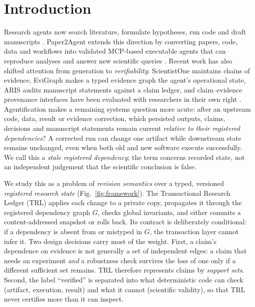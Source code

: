 \documentclass[cmc,article,submit,moreauthors,pdftex]{Definitions/tsp}
\begin{document}
\section{Introduction}
\label{sec:intro}
Research agents now search literature, formulate hypotheses, run code and draft manuscripts \cite{boiko2023coscientist,bran2024chemcrow,swanson2025virtuallab,schmidgall2025agentlab}. Paper2Agent extends this direction by converting papers, code, data and workflows into validated MCP-based executable agents that can reproduce analyses and answer new scientific queries \cite{miao2026paper2agent}. Recent work has also shifted attention from generation to \emph{verifiability}: ScientistOne maintains chains of evidence, EviGraph makes a typed evidence graph the agent's operational state, ARIS audits manuscript statements against a claim ledger, and claim--evidence provenance interfaces have been evaluated with researchers in their own right \cite{meng2026scientistone,ren2026evigraph,yang2026aris,martinboyle2026papertrail}. Agentification makes a remaining systems question more acute: after an upstream code, data, result or evidence correction, which persisted outputs, claims, decisions and manuscript statements remain current \emph{relative to their registered dependencies}? A corrected run can change one artifact while downstream state remains unchanged, even when both old and new software execute successfully. We call this a \emph{stale registered dependency}; the term concerns recorded state, not an independent judgement that the scientific conclusion is false.

We study this as a problem of \emph{revision semantics} over a typed, versioned \emph{registered research state} (Fig.~\ref{fig:framework}). The Transactional Research Ledger (TRL) applies each change to a private copy, propagates it through the registered dependency graph $G$, checks global invariants, and either commits a content-addressed snapshot or rolls back. Its contract is deliberately conditional: if a dependency is absent from or mistyped in $G$, the transaction layer cannot infer it. Two design decisions carry most of the weight. First, a claim's dependence on evidence is not generally a set of independent edges: a claim that needs an experiment \emph{and} a robustness check survives the loss of one only if a different sufficient set remains. TRL therefore represents claims by \emph{support sets}. Second, the label ``verified'' is separated into what deterministic code can check (artifact, execution, result) and what it cannot (scientific validity), so that TRL never certifies more than it can inspect.
\end{document}
